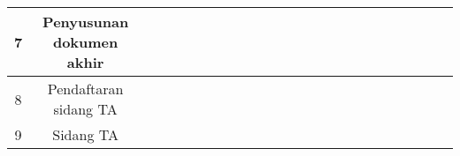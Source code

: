 \begin{table}[h]
{\begin{tabular}{|c|c|l|l|l|l|l|l|l|l|l|l|l|l|l|l|l|l|l|l|l|l|l|l|}
			\hline
			7                   & Penyusunan dokumen akhir                                                   &                                      &                                      & {\cellcolor[rgb]{0.502,0.502,0.502}} & {\cellcolor[rgb]{0.502,0.502,0.502}} & {\cellcolor[rgb]{0.502,0.502,0.502}} & {\cellcolor[rgb]{0.502,0.502,0.502}} & {\cellcolor[rgb]{0.502,0.502,0.502}} & {\cellcolor[rgb]{0.502,0.502,0.502}} & {\cellcolor[rgb]{0.502,0.502,0.502}} & {\cellcolor[rgb]{0.502,0.502,0.502}} & {\cellcolor[rgb]{0.502,0.502,0.502}} & {\cellcolor[rgb]{0.502,0.502,0.502}} & {\cellcolor[rgb]{0.502,0.502,0.502}} & {\cellcolor[rgb]{0.502,0.502,0.502}} & {\cellcolor[rgb]{0.502,0.502,0.502}} & {\cellcolor[rgb]{0.502,0.502,0.502}} & {\cellcolor[rgb]{0.502,0.502,0.502}} & {\cellcolor[rgb]{0.502,0.502,0.502}} & {\cellcolor[rgb]{0.502,0.502,0.502}} & {\cellcolor[rgb]{0.502,0.502,0.502}} &                                      &                                       \\ 
			\hline
			8                   & Pendaftaran sidang TA                                                      &                                      &                                      &                                      &                                      &                                      &                                      &                                      &                                      &                                      &                                      &                                      &                                      &                                      &                                      &                                      &                                      &                                      &                                      &                                      &                                      & {\cellcolor[rgb]{0.502,0.502,0.502}} &                                       \\ 
			\hline
			9                   & Sidang TA                                                                  &                                      &                                      &                                      &                                      &                                      &                                      &                                      &                                      &                                      &                                      &                                      &                                      &                                      &                                      &                                      &                                      &                                      &                                      &                                      &                                      &                                      & {\cellcolor[rgb]{0.502,0.502,0.502}}  \\
			\hline
		\end{tabular}
	}
	
\end{table}

